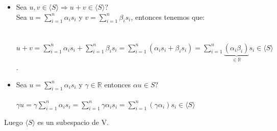 \documentclass{article}
\begin{document}
\begin{enumerate}[a.]
\begin{itemize}
		\item
			Sea $u,v \in \langle S \rangle \Rightarrow u+v \in \langle S\rangle?$ \\
			Sea $u = \displaystyle \sum_{i=1}^{n}{\alpha_i s_i}$ y $v = \displaystyle \sum_{i=1}^{n}{\beta_i s_i}$, entonces
			tenemos que: \\ \\ \\
			$u+v = \displaystyle \sum_{i=1}^{n}{\alpha_i s_i} + \sum_{i=1}^{n}{\beta_i s_i} =
			\sum_{i=1}^{n}{(\alpha_i s_i + \beta_i s_i)} = \sum_{i=1}^{n}{\underbrace{(\alpha_i \beta_i)}_{\in \mathbb{R}} s_i}
			\in \langle S \rangle$.
		\item
			Sea $u = \sum_{i=1}^{n}{\alpha_i s_i}$ y $\gamma \in \mathbb{R}$ entonces $\alpha u \in S?$ \\ \\
			$\gamma u = \gamma \sum_{i=1}^{n}{\alpha_i s_i} = \sum_{i=1}^{n}{\gamma \alpha_i s_i} = \sum_{i=1}^{n}{(\gamma \alpha_i) s_i }
			\in \langle S\rangle$
	\end{itemize}
	Luego $\langle S\rangle$ es un subespacio de V.


\end{enumerate}
\end{document}
